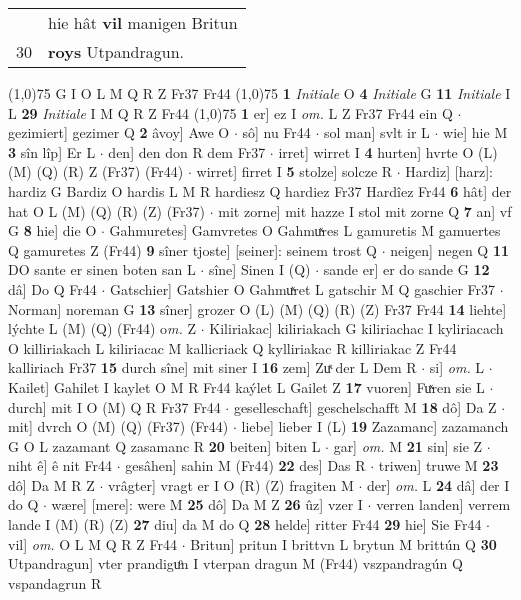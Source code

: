 \documentclass[8pt,a4paper,notitlepage]{article}
\begin{document}
\begin{table}[ht]
\begin{minipage}[t]{0.5\linewidth}
\begin{tabular}{rl}
 & hie hât \textbf{vil} manigen Britun\\ 
30 & \textbf{roys} Utpandragun.\\ 
\end{tabular}
\scriptsize
\line(1,0){75} \newline
G I O L M Q R Z Fr37 Fr44 \newline
\line(1,0){75} \newline
\textbf{1} \textit{Initiale} O  \textbf{4} \textit{Initiale} G  \textbf{11} \textit{Initiale} I L  \textbf{29} \textit{Initiale} I M Q R Z Fr44  \newline
\line(1,0){75} \newline
\textbf{1} er] ez I \textit{om.} L Z Fr37 Fr44 ein Q  $\cdot$ gezimiert] gezimer Q \textbf{2} âvoy] Awe O  $\cdot$ sô] nu Fr44  $\cdot$ sol man] svlt ir L  $\cdot$ wie] hie M \textbf{3} sîn lîp] Er L  $\cdot$ den] den don R dem Fr37  $\cdot$ irret] wirret I \textbf{4} hurten] hvrte O (L) (M) (Q) (R) Z (Fr37) (Fr44)  $\cdot$ wirret] firret I \textbf{5} stolze] solcze R  $\cdot$ Hardiz] [harz]: hardiz G Bardiz O hardis L M R hardiesz Q hardiez Fr37 Hardîez Fr44 \textbf{6} hât] der hat O L (M) (Q) (R) (Z) (Fr37)  $\cdot$ mit zorne] mit hazze I stol mit zorne Q \textbf{7} an] vf G \textbf{8} hie] die O  $\cdot$ Gahmuretes] Gamvretes O Gahmuͯres L gamuretis M gamuertes Q gamuretes Z (Fr44) \textbf{9} sîner tjoste] [seiner]: seinem trost Q  $\cdot$ neigen] negen Q \textbf{11} DO sante er sinen boten san L  $\cdot$ sîne] Sinen I (Q)  $\cdot$ sande er] er do sande G \textbf{12} dâ] Do Q Fr44  $\cdot$ Gatschier] Gatshier O Gahmuͯret L gatschir M Q gaschier Fr37  $\cdot$ Norman] noreman G \textbf{13} sîner] grozer O (L) (M) (Q) (R) (Z) Fr37 Fr44 \textbf{14} liehte] lýchte L (M) (Q) (Fr44) o\textit{m. } Z  $\cdot$ Kiliriakac] kiliriakach G kiliriachac I kyliriacach O killiriakach L kiliriacac M kallicriack Q kylliriakac R killiriakac Z Fr44 kalliriach Fr37 \textbf{15} durch sîne] mit siner I \textbf{16} zem] Zuͯ der L Dem R  $\cdot$ si] \textit{om.} L  $\cdot$ Kailet] Gahilet I kaylet O M R Fr44 kaýlet L Gailet Z \textbf{17} vuoren] Fuͯren sie L  $\cdot$ durch] mit I O (M) Q R Fr37 Fr44  $\cdot$ geselleschaft] geschelschafft M \textbf{18} dô] Da Z  $\cdot$ mit] dvrch O (M) (Q) (Fr37) (Fr44)  $\cdot$ liebe] lieber I (L) \textbf{19} Zazamanc] zazamanch G O L zazamant Q zasamanc R \textbf{20} beiten] biten L  $\cdot$ gar] \textit{om.} M \textbf{21} sin] sie Z  $\cdot$ niht ê] ê nit Fr44  $\cdot$ gesâhen] sahin M (Fr44) \textbf{22} des] Das R  $\cdot$ triwen] truwe M \textbf{23} dô] Da M R Z  $\cdot$ vrâgter] vragt er I O (R) (Z) fragiten M  $\cdot$ der] \textit{om.} L \textbf{24} dâ] der I do Q  $\cdot$ wære] [mere]: were M \textbf{25} dô] Da M Z \textbf{26} ûz] vzer I  $\cdot$ verren landen] verrem lande I (M) (R) (Z) \textbf{27} diu] da M do Q \textbf{28} helde] ritter Fr44 \textbf{29} hie] Sie Fr44  $\cdot$ vil] \textit{om.} O L M Q R Z Fr44  $\cdot$ Britun] pritun I brittvn L brytun M brittún Q \textbf{30} Utpandragun] vter prandiguͦn I vterpan dragun M (Fr44) vszpandragún Q vspandagrun R \newline

\end{minipage}
\end{table}
\end{document}
